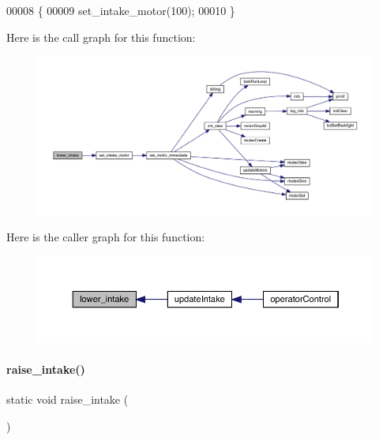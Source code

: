 \begin{DoxyCode}
00008                            \{
00009   set_intake_motor(100);
00010 \}
\end{DoxyCode}
Here is the call graph for this function\+:\nopagebreak
\begin{figure}[H]
\begin{center}
\leavevmode
\includegraphics[width=350pt]{mobile__goal__intake_8c_afa91470a9891e48827fd62d18553c6ce_cgraph}
\end{center}
\end{figure}
Here is the caller graph for this function\+:\nopagebreak
\begin{figure}[H]
\begin{center}
\leavevmode
\includegraphics[width=350pt]{mobile__goal__intake_8c_afa91470a9891e48827fd62d18553c6ce_icgraph}
\end{center}
\end{figure}
\mbox{\label{mobile__goal__intake_8c_a4899f9a8621015313e6312ce085da979}} 
\paragraph{raise\+\_\+intake()}
{\footnotesize\ttfamily static void raise\+\_\+intake (\begin{DoxyParamCaption}{ }\end{DoxyParamCaption})\hspace{0.3cm}{\ttfamily [static]}}



